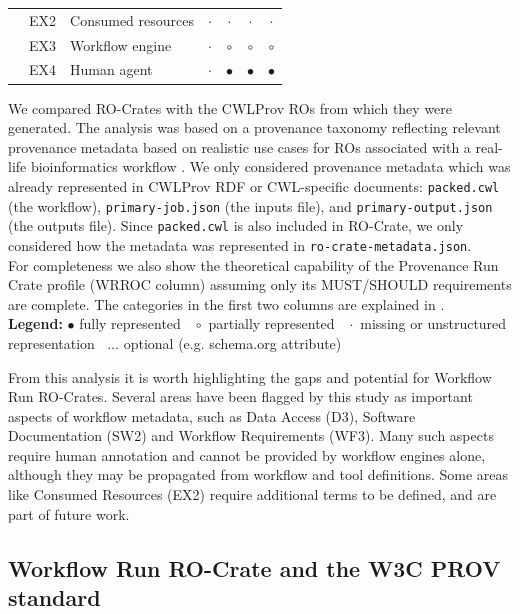 \documentclass[10pt,letterpaper]{article}
\begin{document}
\begin{table}[!ht]
\begin{adjustwidth}{-1.4cm}{0in}
\begin{tabular}{r|l|l|c|c|c|c}
& EX2 & Consumed resources      & $\cdot$ & $\cdot$ & $\cdot$ & $\cdot$  \\ 
& EX3 & Workflow engine         & $\cdot$ & $\circ$ & $\circ$ & $\circ$  \\  
& EX4 & Human agent             & $\cdot$ & $\bullet$ & $\bullet$ & $\bullet$ \\ \hline
\end{tabular}
\begin{flushleft} We compared RO-Crates with the CWLProv ROs from which they were generated.
The analysis was based on a provenance taxonomy reflecting relevant provenance metadata based on realistic use cases for ROs associated with a real-life bioinformatics workflow \cite{De Wit 2022}.
We only considered provenance metadata which was already represented in CWLProv RDF or CWL-specific documents: \texttt{packed.cwl} (the workflow), \texttt{primary-job.json} (the inputs file), and \texttt{primary-output.json} (the outputs file).
Since \texttt{packed.cwl} is also included in RO-Crate, we only considered how the metadata was represented in \texttt{ro-crate-metadata.json}.\\
For completeness we also show the theoretical capability of the Provenance Run Crate profile (WRROC column) assuming only its MUST/SHOULD requirements are complete.
The categories in the first two columns are explained in \cite{De Wit 2022}.
\\
\textbf{Legend:} $\bullet$ fully represented  $\;\;\circ$ partially represented   $\;\;\cdot$ missing or unstructured representation $\;\;\dots$ optional (e.g. schema.org attribute)
\end{flushleft}
\label{analysis_table}
\end{adjustwidth}
\end{table}

From this analysis it is worth highlighting the gaps and potential for Workflow Run RO-Crates. Several areas have been flagged by this study as important aspects of workflow metadata, such as Data Access (D3), Software Documentation (SW2) and Workflow Requirements (WF3). Many such aspects require human annotation and cannot be provided by workflow engines alone, although they may be propagated from workflow and tool definitions. Some areas like Consumed Resources (EX2) require additional terms to be defined, and are part of future work.


\subsection{Workflow Run RO-Crate and the W3C PROV standard}
\end{document}
